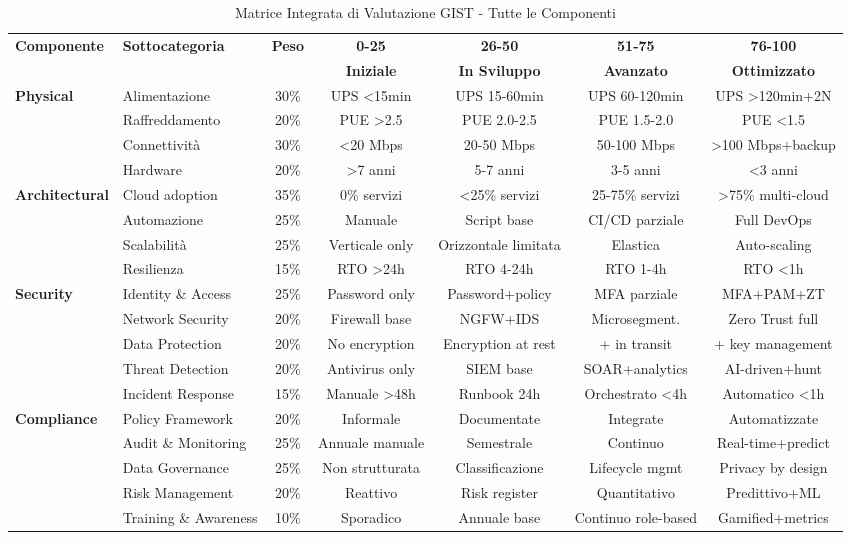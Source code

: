 \begin{landscape}
\begin{table}[H]
\centering
\caption{Matrice Integrata di Valutazione GIST - Tutte le Componenti}
\label{tab:matrice-completa}
\footnotesize
\begin{tabular}{l l c c c c c}
\toprule
\textbf{Componente} & \textbf{Sottocategoria} & \textbf{Peso} & \textbf{0-25} & \textbf{26-50} & \textbf{51-75} & \textbf{76-100} \\
& & & \textbf{Iniziale} & \textbf{In Sviluppo} & \textbf{Avanzato} & \textbf{Ottimizzato} \\
\midrule
\multirow{4}{*}{\textbf{Physical}} 
& Alimentazione & 30\% & UPS <15min & UPS 15-60min & UPS 60-120min & UPS >120min+2N \\
& Raffreddamento & 20\% & PUE >2.5 & PUE 2.0-2.5 & PUE 1.5-2.0 & PUE <1.5 \\
& Connettività & 30\% & <20 Mbps & 20-50 Mbps & 50-100 Mbps & >100 Mbps+backup \\
& Hardware & 20\% & >7 anni & 5-7 anni & 3-5 anni & <3 anni \\
\midrule
\multirow{4}{*}{\textbf{Architectural}} 
& Cloud adoption & 35\% & 0\% servizi & <25\% servizi & 25-75\% servizi & >75\% multi-cloud \\
& Automazione & 25\% & Manuale & Script base & CI/CD parziale & Full DevOps \\
& Scalabilità & 25\% & Verticale only & Orizzontale limitata & Elastica & Auto-scaling \\
& Resilienza & 15\% & RTO >24h & RTO 4-24h & RTO 1-4h & RTO <1h \\
\midrule
\multirow{5}{*}{\textbf{Security}} 
& Identity \& Access & 25\% & Password only & Password+policy & MFA parziale & MFA+PAM+ZT \\
& Network Security & 20\% & Firewall base & NGFW+IDS & Microsegment. & Zero Trust full \\
& Data Protection & 20\% & No encryption & Encryption at rest & + in transit & + key management \\
& Threat Detection & 20\% & Antivirus only & SIEM base & SOAR+analytics & AI-driven+hunt \\
& Incident Response & 15\% & Manuale >48h & Runbook 24h & Orchestrato <4h & Automatico <1h \\
\midrule
\multirow{5}{*}{\textbf{Compliance}} 
& Policy Framework & 20\% & Informale & Documentate & Integrate & Automatizzate \\
& Audit \& Monitoring & 25\% & Annuale manuale & Semestrale & Continuo & Real-time+predict \\
& Data Governance & 25\% & Non strutturata & Classificazione & Lifecycle mgmt & Privacy by design \\
& Risk Management & 20\% & Reattivo & Risk register & Quantitativo & Predittivo+ML \\
& Training \& Awareness & 10\% & Sporadico & Annuale base & Continuo role-based & Gamified+metrics \\
\bottomrule
\end{tabular}
\end{table}
\end{landscape}

